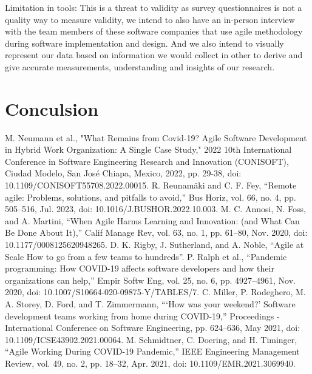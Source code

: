 \documentclass[conference]{IEEEtran}
\begin{document}
Limitation in tools: This is a threat to validity as survey questionnaires is not a quality way to measure validity, we intend to also have an in-person interview with the team members of these software companies that use agile methodology during software implementation and design. And we also intend to visually represent our data based on information we would collect in other to derive and give accurate measurements, understanding and insights of our research.
\section{Conculsion}

\begin{thebibliography}{00}
     M. Neumann et al., "What Remains from Covid-19? Agile Software Development in Hybrid Work Organization: A Single Case Study," 2022 10th International Conference in Software Engineering Research and Innovation (CONISOFT), Ciudad Modelo, San José Chiapa, Mexico, 2022, pp. 29-38, doi: 10.1109/CONISOFT55708.2022.00015.
     R. Reunamäki and C. F. Fey, “Remote agile: Problems, solutions, and pitfalls to avoid,” Bus Horiz, vol. 66, no. 4, pp. 505–516, Jul. 2023, doi: 10.1016/J.BUSHOR.2022.10.003. 
     M. C. Annosi, N. Foss, and A. Martini, “When Agile Harms Learning and Innovation: (and What Can Be Done About It),” Calif Manage Rev, vol. 63, no. 1, pp. 61–80, Nov. 2020, doi: 10.1177/0008125620948265. 
     D. K. Rigby, J. Sutherland, and A. Noble, “Agile at Scale How to go from a few teams to hundreds”.
     P. Ralph et al., “Pandemic programming: How COVID-19 affects software developers and how their organizations can help,” Empir Softw Eng, vol. 25, no. 6, pp. 4927–4961, Nov. 2020, doi: 10.1007/S10664-020-09875-Y/TABLES/7.
     C. Miller, P. Rodeghero, M. A. Storey, D. Ford, and T. Zimmermann, “‘How was your weekend?’ Software development teams working from home during COVID-19,” Proceedings - International Conference on Software Engineering, pp. 624–636, May 2021, doi: 10.1109/ICSE43902.2021.00064. 
     M. Schmidtner, C. Doering, and H. Timinger, “Agile Working During COVID-19 Pandemic,” IEEE Engineering Management Review, vol. 49, no. 2, pp. 18–32, Apr. 2021, doi: 10.1109/EMR.2021.3069940.
\end{thebibliography}
\end{document}
